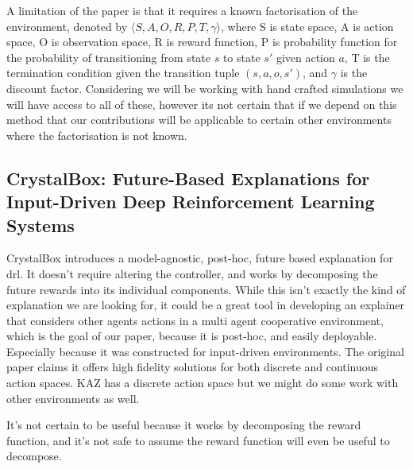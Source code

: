 \documentclass[UKenglish]{uiomasterthesis}
\begin{document}
A limitation of the paper is that it requires a known factorisation of the environment, denoted by $\langle S, A, O, R, P, T, \gamma \rangle$, where S is state space, A is action space, O is observation space, R is reward function, P is probability function for the probability of transitioning from state $s$ to state $s'$ given action $a$, T is the termination condition given the transition tuple $(s,a,o,s')$, and $\gamma$ is the discount factor. Considering we will be working with hand crafted simulations we will have access to all of these, however its not certain that if we depend on this method that our contributions will be applicable to certain other environments where the factorisation is not known.


\subsection{CrystalBox: Future-Based Explanations for Input-Driven Deep Reinforcement Learning Systems}
CrystalBox introduces a model-agnostic, post-hoc, future based explanation for \ac{drl}. It doesn't require altering the controller, and works by decomposing the future rewards into its individual components. While this isn't exactly the kind of explanation we are looking for, it could be a great tool in developing an explainer that considers other agents actions in a multi agent cooperative environment, which is the goal of our paper, because it is post-hoc, and easily deployable. Especially because it was constructed for input-driven environments. The original paper claims it offers high fidelity solutions for both discrete and continuous action spaces. KAZ has a discrete action space but we might do some work with other environments as well.

It's not certain to be useful because it works by decomposing the reward function, and it's not safe to assume the reward function will even be useful to decompose.
\end{document}
